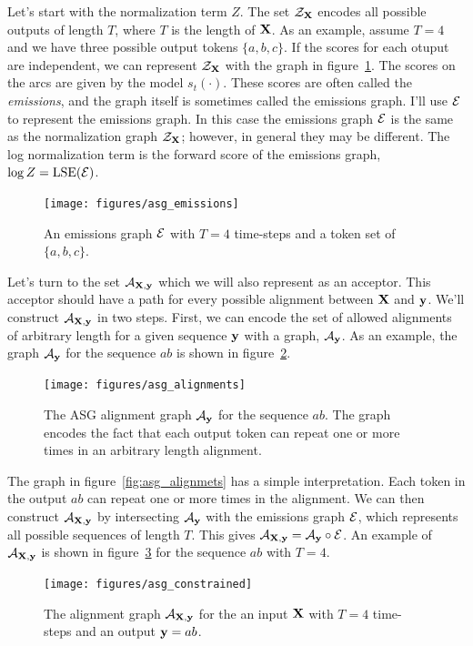 Let's start with the normalization term $Z$. The set $\mathcal{Z}_{\bf X}$ encodes all
possible outputs of length $T$, where $T$ is the length of ${\bf X}$. As an
example, assume $T=4$ and we have three possible output tokens $\{a, b, c\}$.
If the scores for each otuput are independent, we can represent $\mathcal{Z}_{\bf X}$ with
the graph in figure~\ref{fig:asg_emissions}. The scores on the arcs are given
by the model $s_t(\cdot)$.  These scores are often called the \emph{emissions},
and the graph itself is sometimes called the emissions graph. I'll use $\mathcal{E}$ to
represent the emissions graph. In this case the emissions graph $\mathcal{E}$ is the
same as the normalization graph $\mathcal{Z}_{\bf X}$; however, in general they may be
different. The log normalization term is the forward score of the emissions
graph, $\log Z = \operatorname*{\textrm{LSE}}(\mathcal{E})$.

\begin{figure}
    \centering
    \texttt{[image: figures/asg\_emissions]}
    \caption{An emissions graph $\mathcal{E}$ with $T=4$ time-steps and a token set of
    $\{a, b, c\}$.}
    \label{fig:asg_emissions}
\end{figure}

Let's turn to the set $\mathcal{A}_{{\bf X}, {\bf y}}$ which we will also represent as an
acceptor. This acceptor should have a path for every possible alignment between
${\bf X}$ and ${\bf y}$. We'll construct $\mathcal{A}_{{\bf X}, {\bf y}}$ in two steps. First, we can
encode the set of allowed alignments of arbitrary length for a given sequence
${\bf y}$ with a graph, $\mathcal{A}_{\bf y}$. As an example, the graph $\mathcal{A}_{\bf y}$ for the
sequence $ab$ is shown in figure~\ref{fig:asg_alignments}.

\begin{figure}
    \centering
    \texttt{[image: figures/asg\_alignments]}
    \caption{The ASG alignment graph $\mathcal{A}_{\bf y}$ for the sequence $ab$. The graph
    encodes the fact that each output token can repeat one or more times in an
    arbitrary length alignment.}
    \label{fig:asg_alignments}
\end{figure}

The graph in figure~\ref{fig:asg_alignmets} has a simple interpretation. Each
token in the output $ab$ can repeat one or more times in the alignment. We can
then construct $\mathcal{A}_{{\bf X},{\bf y}}$ by intersecting $\mathcal{A}_{\bf y}$ with the emissions
graph $\mathcal{E}$, which represents all possible sequences of length $T$. This gives
$\mathcal{A}_{{\bf X},{\bf y}} = \mathcal{A}_{\bf y} \circ \mathcal{E}$. An example of $\mathcal{A}_{{\bf X}, {\bf y}}$ is shown in
figure~\ref{fig:asg_constrained} for the sequence $ab$ with $T=4$.

\begin{figure}
    \centering
    \texttt{[image: figures/asg\_constrained]}
    \caption{The alignment graph $\mathcal{A}_{{\bf X}, {\bf y}}$ for the an input ${\bf X}$ with
    $T=4$ time-steps and an output ${\bf y} = ab$.}
    \label{fig:asg_constrained}
\end{figure}

